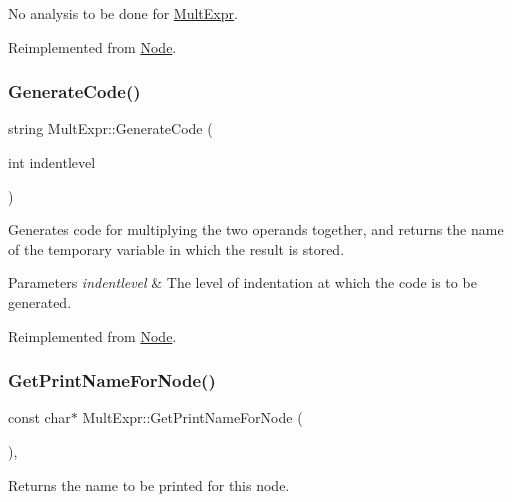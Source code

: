 No analysis to be done for \hyperlink{class_mult_expr}{Mult\+Expr}. 

Reimplemented from \hyperlink{class_node_a5f88d55c6f253a29def7ccc443d83d47}{Node}.

\mbox{\label{class_mult_expr_a06698bfc99d60d7ce2fde5d7f0addc66}} 
\subsubsection{\texorpdfstring{Generate\+Code()}{GenerateCode()}}
{\footnotesize\ttfamily string Mult\+Expr\+::\+Generate\+Code (\begin{DoxyParamCaption}\item[{int}]{indentlevel }\end{DoxyParamCaption})\hspace{0.3cm}{\ttfamily [virtual]}}

Generates code for multiplying the two operands together, and returns the name of the temporary variable in which the result is stored. 
\begin{DoxyParams}{Parameters}
{\em indentlevel} & The level of indentation at which the code is to be generated. \\
\hline
\end{DoxyParams}


Reimplemented from \hyperlink{class_node_acb60e526730e8436056375a3055c2c32}{Node}.

\mbox{\label{class_mult_expr_af09a0cb0e06bfc24892dee567f48808c}} 
\subsubsection{\texorpdfstring{Get\+Print\+Name\+For\+Node()}{GetPrintNameForNode()}}
{\footnotesize\ttfamily const char$\ast$ Mult\+Expr\+::\+Get\+Print\+Name\+For\+Node (\begin{DoxyParamCaption}{ }\end{DoxyParamCaption})\hspace{0.3cm}{\ttfamily [inline]}, {\ttfamily [virtual]}}

Returns the name to be printed for this node. 


